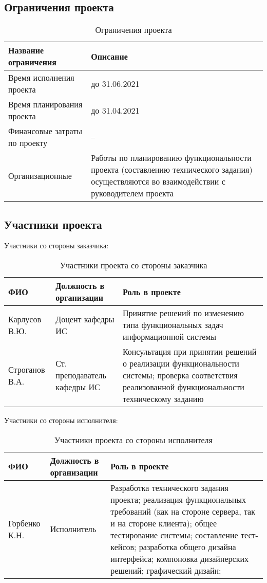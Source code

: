\documentclass[a4paper,14pt]{extarticle}
\begin{document}
\subsection{Ограничения проекта}
\begin{table}[H]
    \caption{Ограничения проекта}
    \begin{tabular}{ | p{5.425cm} | p{11cm} | }
        \hline
        Название ограничения & Описание \\ \hline
        Время исполнения проекта & до 31.06.2021 \\ \hline
        Время планирования проекта & до 31.04.2021 \\ \hline
        Финансовые затраты по проекту & -- \\ \hline
        Организационные & Работы по планированию функциональности проекта (составлению технического задания) осуществляются во взаимодействии с руководителем проекта \\ \hline
    \end{tabular}
\end{table}

\subsection{Участники проекта}
Участники со стороны заказчика:
\begin{table}[H]
    \caption{Участники проекта со стороны заказчика}
    \begin{tabular}{ | p{4cm} | p{5cm} | p{7cm} | }
        \hline
        ФИО & Должность в организации & Роль в проекте \\ \hline
        Карлусов В.Ю. & Доцент кафедры ИС & Принятие решений по изменению типа функциональных задач информационной системы \\ \hline
        Строганов В.А. & Ст. преподаватель кафедры ИС & Консультация при принятии решений о реализации функциональности системы; проверка соответствия реализованной функциональности техническому заданию \\ \hline
    \end{tabular}
\end{table}

Участники со стороны исполнителя:
\begin{table}[H]
    \caption{Участники проекта со стороны исполнителя}
    \begin{tabular}{ | p{4cm} | p{5cm} | p{7cm} | }
        \hline
        ФИО & Должность в организации & Роль в проекте \\ \hline
        Горбенко К.Н. & Исполнитель & Разработка технического задания проекта;
        реализация функциональных требований (как на стороне сервера, так и на
        стороне клиента); общее тестирование системы; составление тест-кейсов;
        разработка общего дизайна интерфейса; компоновка дизайнерских решений;
        графический дизайн; \\ \hline
    \end{tabular}
\end{table}
\end{document}
